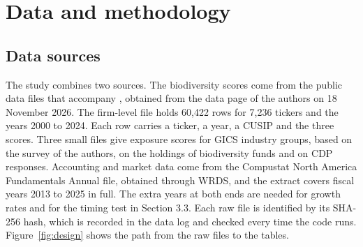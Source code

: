 \documentclass[12pt,a4paper]{article}
\begin{document}
\section{Data and methodology}

\subsection{Data sources}

The study combines two sources. The biodiversity scores come from the public data files that accompany \citet{giglio2026}, obtained from the data page of the authors on 18 November 2026. The firm-level file holds 60,422 rows for 7,236 tickers and the years 2000 to 2024. Each row carries a ticker, a year, a CUSIP and the three scores. Three small files give exposure scores for GICS industry groups, based on the survey of the authors, on the holdings of biodiversity funds and on CDP responses. Accounting and market data come from the Compustat North America Fundamentals Annual file, obtained through WRDS, and the extract covers fiscal years 2013 to 2025 in full. The extra years at both ends are needed for growth rates and for the timing test in Section 3.3. Each raw file is identified by its SHA-256 hash, which is recorded in the data log and checked every time the code runs. Figure~\ref{fig:design} shows the path from the raw files to the tables.
\end{document}
